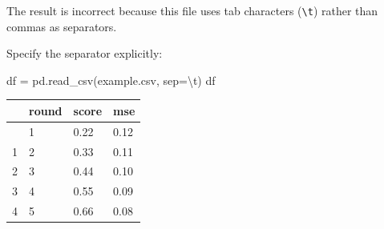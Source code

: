 \documentclass[
  letterpaper,
  DIV=11,
  numbers=noendperiod]{scrreprt}
\newenvironment{Shaded}{\begin{snugshade}}{\end{snugshade}}
\newcommand{\CharTok}[1]{\textcolor[rgb]{0.13,0.47,0.30}{#1}}
\newcommand{\NormalTok}[1]{\textcolor[rgb]{0.00,0.23,0.31}{#1}}
\newcommand{\OperatorTok}[1]{\textcolor[rgb]{0.37,0.37,0.37}{#1}}
\newcommand{\StringTok}[1]{\textcolor[rgb]{0.13,0.47,0.30}{#1}}
\newcounter{none} %
\theoremstyle{definition}
\theoremstyle{definition}
\theoremstyle{plain}
\theoremstyle{plain}
\theoremstyle{remark}
\begin{document}
\begin{tcolorbox}
The result is incorrect because this file uses tab characters
(\texttt{\textbackslash{}t}) rather than commas as separators.

Specify the separator explicitly:

\begin{Shaded}
\begin{Highlighting}[]
\NormalTok{df }\OperatorTok{=}\NormalTok{ pd.read\_csv(}\StringTok{\textquotesingle{}example.csv\textquotesingle{}}\NormalTok{, sep}\OperatorTok{=}\StringTok{\textquotesingle{}}\CharTok{\textbackslash{}t}\StringTok{\textquotesingle{}}\NormalTok{)}
\NormalTok{df}
\end{Highlighting}
\end{Shaded}

{\def\LTcaptype{none} %
\begin{longtable}[]{@{}llll@{}}
\toprule\noalign{}
& round & score & mse \\
\midrule\noalign{}
\endhead
\bottomrule\noalign{}
\endlastfoot
0 & 1 & 0.22 & 0.12 \\
1 & 2 & 0.33 & 0.11 \\
2 & 3 & 0.44 & 0.10 \\
3 & 4 & 0.55 & 0.09 \\
4 & 5 & 0.66 & 0.08 \\
\end{longtable}
}

\end{tcolorbox}
\end{document}
